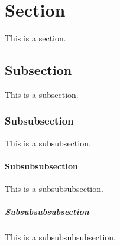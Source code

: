 \documentclass[12pt]{article}
\begin{document}
	\newpage
	\setcounter{secnumdepth}{4} %
	\section{Section}
	This is a section.
	\subsection{Subsection}
	This is a subsection.
	\subsubsection{Subsubsection}
	This is a subsubsection.
	\paragraph{Subsubsubsection}
	This is a subsubsubsection.
	\subparagraph{Subsubsubsubsection}
	This is a subsubsubsubsection.
\end{document}
